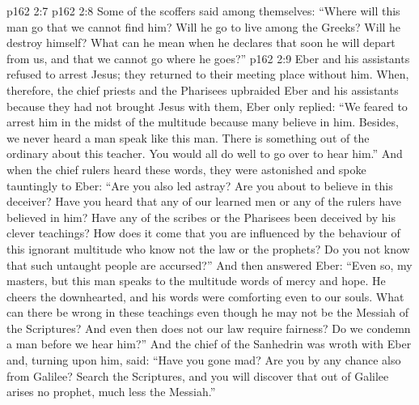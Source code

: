 \vs p162 2:7 
\vs p162 2:8 Some of the scoffers said among themselves: “Where will this man go that we cannot find him? Will he go to live among the Greeks? Will he destroy himself? What can he mean when he declares that soon he will depart from us, and that we cannot go where he goes?”
\vs p162 2:9 Eber and his assistants refused to arrest Jesus; they returned to their meeting place without him. When, therefore, the chief priests and the Pharisees upbraided Eber and his assistants because they had not brought Jesus with them, Eber only replied: “We feared to arrest him in the midst of the multitude because many believe in him. Besides, we never heard a man speak like this man. There is something out of the ordinary about this teacher. You would all do well to go over to hear him.” And when the chief rulers heard these words, they were astonished and spoke tauntingly to Eber: “Are you also led astray? Are you about to believe in this deceiver? Have you heard that any of our learned men or any of the rulers have believed in him? Have any of the scribes or the Pharisees been deceived by his clever teachings? How does it come that you are influenced by the behaviour of this ignorant multitude who know not the law or the prophets? Do you not know that such untaught people are accursed?” And then answered Eber: “Even so, my masters, but this man speaks to the multitude words of mercy and hope. He cheers the downhearted, and his words were comforting even to our souls. What can there be wrong in these teachings even though he may not be the Messiah of the Scriptures? And even then does not our law require fairness? Do we condemn a man before we hear him?” And the chief of the Sanhedrin was wroth with Eber and, turning upon him, said: “Have you gone mad? Are you by any chance also from Galilee? Search the Scriptures, and you will discover that out of Galilee arises no prophet, much less the Messiah.”
